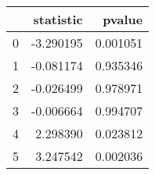 \begin{tabular}{lrr}
\toprule
{} &  statistic &    pvalue \\
\midrule
0 &  -3.290195 &  0.001051 \\
1 &  -0.081174 &  0.935346 \\
2 &  -0.026499 &  0.978971 \\
3 &  -0.006664 &  0.994707 \\
4 &   2.298390 &  0.023812 \\
5 &   3.247542 &  0.002036 \\
\bottomrule
\end{tabular}
